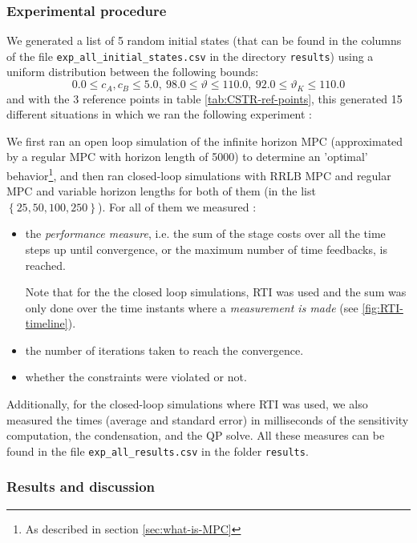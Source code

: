 \documentclass[12pt]{article}
\begin{document}
\subsubsection{Experimental procedure}

We generated a list of 5 random initial states (that can be found in the columns of the file \verb|exp_all_initial_states.csv| in the directory \verb|results|) using a uniform distribution between the following bounds:
$$0.0\leq c_A,c_B\leq 5.0,~98.0\leq\vartheta\leq 110.0,~92.0\leq \vartheta_K\leq 110.0$$
and with the 3 reference points in table \ref{tab:CSTR-ref-points}, this generated 15 different situations in which we ran the following experiment :

We first ran an open loop simulation of the infinite horizon MPC (approximated by a regular MPC with horizon length of 5000) to determine an 'optimal' behavior\footnote{As described in section \ref{sec:what-is-MPC}}, and then ran closed-loop simulations with RRLB MPC and regular MPC and variable horizon lengths for both of them (in the list $\left\{ 25, 50, 100, 250 \right\}$).
For all of them we measured :
\begin{itemize}[label=\textbullet]
	\item the \textit{performance measure}, i.e. the sum of the stage costs over all the time steps up until convergence, or the maximum number of time feedbacks, is reached.

	Note that for the the closed loop simulations, RTI was used and the sum was only done over the time instants where a \textit{measurement is made} (see \ref{fig:RTI-timeline}).

	\item the number of iterations taken to reach the convergence.

	\item whether the constraints were violated or not.
\end{itemize}

\noindent Additionally, for the closed-loop simulations where RTI was used, we also measured the times (average and standard error) in milliseconds of the sensitivity computation, the condensation, and the QP solve.
All these measures can be found in the file \verb|exp_all_results.csv| in the folder \verb|results|.

\subsubsection{Results and discussion}
\end{document}
